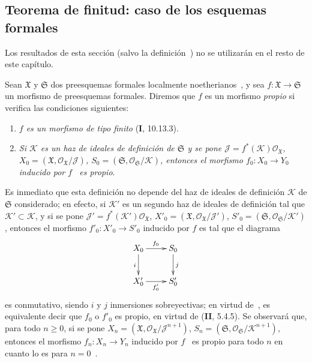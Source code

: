 \subsection{Teorema de finitud: caso de los esquemas formales}
\label{subsection:III.3.4}
\label{subsection:III.3.4-fr}

Los resultados de esta sección (salvo la definición~) no se utilizarán en el resto de este capítulo.

\begin{env}[3.4.1]
\label{III.3.4.1}
\label{III.3.4.1-fr}
Sean $\mathfrak X$ y $\mathfrak S$ dos preesquemas formales localmente noetherianos~, y sea $f:\mathfrak X\to\mathfrak S$ un morfismo de preesquemas formales.
Diremos que $f$ es un morfismo \emph{propio} si
verifica las condiciones siguientes:
\begin{enumerate}
\item[$1^\circ$] \emph{$f$ es un morfismo de tipo finito} (\textbf{I}, 10.13.3).
\item[$2^\circ$] \emph{Si $\mathcal K$ es un haz de ideales de definición de $\mathfrak S$ y se pone $\mathcal J=f^*(\mathcal K)\mathcal O_{\mathfrak X}$, $X_0=(\mathfrak X,\mathcal O_{\mathfrak X}/\mathcal J)$, $S_0=(\mathfrak S,\mathcal O_{\mathfrak S}/\mathcal K)$, entonces el morfismo $f_0:X_0\to Y_0$ inducido por $f$~ es propio}.
\end{enumerate}
Es inmediato que esta definición no depende del haz de ideales de definición $\mathcal K$ de $\mathfrak S$ considerado; en efecto, si $\mathcal K'$ es un segundo haz de ideales de definición tal que $\mathcal K'\subset\mathcal K$, y si se pone $\mathcal J'=f^*(\mathcal K')\mathcal O_{\mathfrak X}$, $X'_0=(\mathfrak X,\mathcal O_{\mathfrak X}/\mathcal J')$, $S'_0=(\mathfrak S,\mathcal O_{\mathfrak S}/\mathcal K')$, entonces el morfismo $f'_0:X'_0\to S'_0$ inducido por $f$ es tal que el diagrama
\[
\xymatrix{
X_0\ar[r]^{f_0}\ar[d]_i & S_0\ar[d]^j\\
X'_0\ar[r]_{f'_0} & S'_0
}
\]
es conmutativo, siendo $i$ y $j$ inmersiones sobreyectivas; en virtud de~, es equivalente decir que $f_0$ o $f'_0$ es propio, en virtud de (\textbf{II}, 5.4.5). Se observará que, para todo $n\geq0$, si se pone $X_n=(\mathfrak X,\mathcal O_{\mathfrak X}/\mathcal J^{n+1})$, $S_n=(\mathfrak S,\mathcal O_{\mathfrak S}/\mathcal K^{n+1})$, entonces el morfismo $f_n:X_n\to Y_n$ inducido por $f$~ es propio para todo $n$ en cuanto lo es para $n=0$~.


\end{env}
